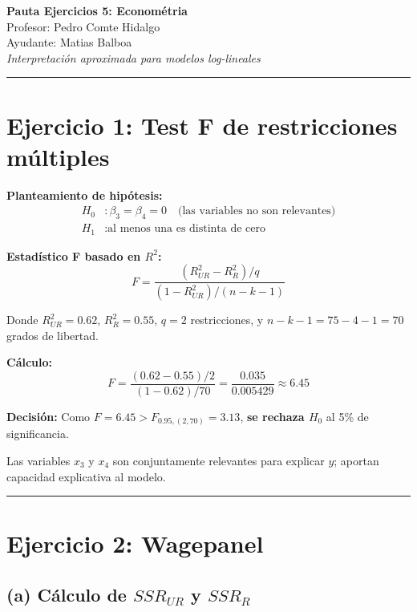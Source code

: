 \documentclass[11pt,a4paper]{article}
\begin{document}
\begin{center}
    {\Large \textbf{Pauta Ejercicios 5: Econométria}}\\[0.3cm]
    Profesor: Pedro Comte Hidalgo \\
    Ayudante: Matias Balboa \\
    \textit{Interpretación aproximada para modelos log-lineales}
\end{center}

\vspace{0.5cm}
\hrule
\vspace{0.5cm}

\section*{Ejercicio 1: Test F de restricciones múltiples}

\textbf{Planteamiento de hipótesis:}
\begin{align*}
H_0 &: \beta_3 = \beta_4 = 0 \quad \text{(las variables no son relevantes)} \\
H_1 &: \text{al menos una es distinta de cero}
\end{align*}

\textbf{Estadístico F basado en \(R^2\):}
\[
F = \frac{(R^2_{UR} - R^2_R)/q}{(1-R^2_{UR})/(n-k-1)}
\]

Donde \(R^2_{UR} = 0.62\), \(R^2_R = 0.55\), \(q = 2\) restricciones, y \(n - k - 1 = 75 - 4 - 1 = 70\) grados de libertad.

\textbf{Cálculo:}
\[
F = \frac{(0.62 - 0.55)/2}{(1-0.62)/70} = \frac{0.035}{0.005429} \approx 6.45
\]

\textbf{Decisión:} Como \(F = 6.45 > F_{0.95,(2,70)} = 3.13\), \textbf{se rechaza \(H_0\)} al 5\% de significancia.

\begin{conclusion}
Las variables \(x_3\) y \(x_4\) son conjuntamente relevantes para explicar \(y\); aportan capacidad explicativa al modelo.
\end{conclusion}

\vspace{0.5cm}
\hrule
\vspace{0.5cm}

\section*{Ejercicio 2: Wagepanel}

\subsection*{(a) Cálculo de \(SSR_{UR}\) y \(SSR_R\)}
\end{document}
